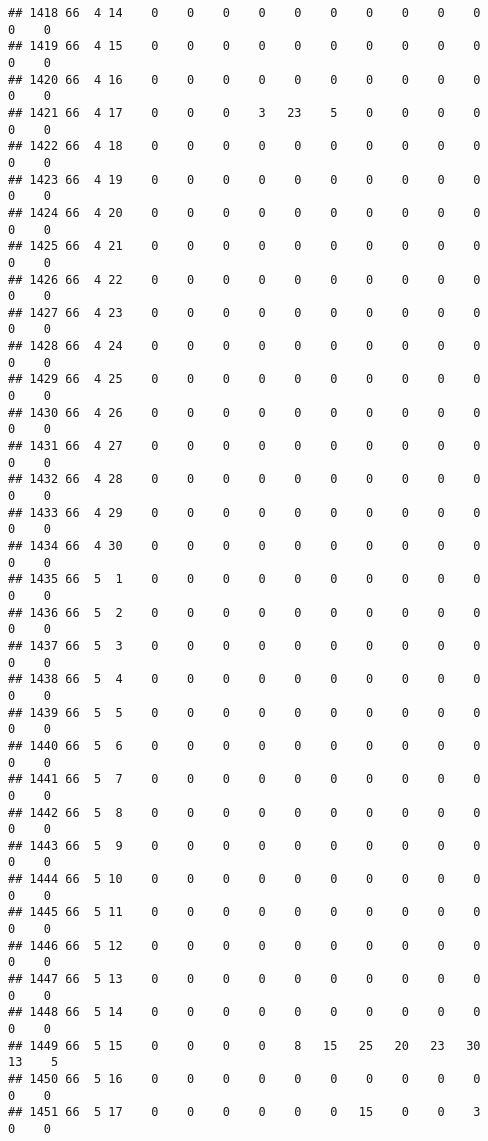 \documentclass[]{article}
\begin{document}
\begin{verbatim}
## 1418 66  4 14    0    0    0    0    0    0    0    0    0    0    0    0
## 1419 66  4 15    0    0    0    0    0    0    0    0    0    0    0    0
## 1420 66  4 16    0    0    0    0    0    0    0    0    0    0    0    0
## 1421 66  4 17    0    0    0    3   23    5    0    0    0    0    0    0
## 1422 66  4 18    0    0    0    0    0    0    0    0    0    0    0    0
## 1423 66  4 19    0    0    0    0    0    0    0    0    0    0    0    0
## 1424 66  4 20    0    0    0    0    0    0    0    0    0    0    0    0
## 1425 66  4 21    0    0    0    0    0    0    0    0    0    0    0    0
## 1426 66  4 22    0    0    0    0    0    0    0    0    0    0    0    0
## 1427 66  4 23    0    0    0    0    0    0    0    0    0    0    0    0
## 1428 66  4 24    0    0    0    0    0    0    0    0    0    0    0    0
## 1429 66  4 25    0    0    0    0    0    0    0    0    0    0    0    0
## 1430 66  4 26    0    0    0    0    0    0    0    0    0    0    0    0
## 1431 66  4 27    0    0    0    0    0    0    0    0    0    0    0    0
## 1432 66  4 28    0    0    0    0    0    0    0    0    0    0    0    0
## 1433 66  4 29    0    0    0    0    0    0    0    0    0    0    0    0
## 1434 66  4 30    0    0    0    0    0    0    0    0    0    0    0    0
## 1435 66  5  1    0    0    0    0    0    0    0    0    0    0    0    0
## 1436 66  5  2    0    0    0    0    0    0    0    0    0    0    0    0
## 1437 66  5  3    0    0    0    0    0    0    0    0    0    0    0    0
## 1438 66  5  4    0    0    0    0    0    0    0    0    0    0    0    0
## 1439 66  5  5    0    0    0    0    0    0    0    0    0    0    0    0
## 1440 66  5  6    0    0    0    0    0    0    0    0    0    0    0    0
## 1441 66  5  7    0    0    0    0    0    0    0    0    0    0    0    0
## 1442 66  5  8    0    0    0    0    0    0    0    0    0    0    0    0
## 1443 66  5  9    0    0    0    0    0    0    0    0    0    0    0    0
## 1444 66  5 10    0    0    0    0    0    0    0    0    0    0    0    0
## 1445 66  5 11    0    0    0    0    0    0    0    0    0    0    0    0
## 1446 66  5 12    0    0    0    0    0    0    0    0    0    0    0    0
## 1447 66  5 13    0    0    0    0    0    0    0    0    0    0    0    0
## 1448 66  5 14    0    0    0    0    0    0    0    0    0    0    0    0
## 1449 66  5 15    0    0    0    0    8   15   25   20   23   30   13    5
## 1450 66  5 16    0    0    0    0    0    0    0    0    0    0    0    0
## 1451 66  5 17    0    0    0    0    0    0   15    0    0    3    0    0

\end{verbatim}
\end{document}
